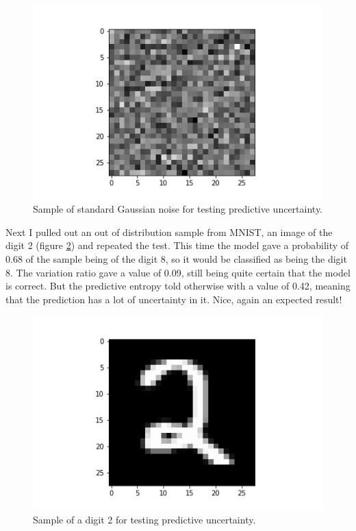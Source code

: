 \documentclass[11pt]{article}
\begin{document}
\begin{figure}
    \center
    \includegraphics[scale=0.5]{images/gaussian-noise}
    \caption{Sample of standard Gaussian noise for testing predictive uncertainty.}
    \label{fig:gaussian-noise}
\end{figure}

Next I pulled out an out of distribution sample from MNIST, an image of the digit 2 (figure \ref{fig:two}) and repeated the test. This time the model gave a probability of 0.68 of the sample being of the digit 8, so it would be classified as being the digit 8. The variation ratio gave a value of 0.09, still being quite certain that the model is correct. But the predictive entropy told otherwise with a value of 0.42, meaning that the prediction has a lot of uncertainty in it. Nice, again an expected result!

\begin{figure}
    \center
    \includegraphics[scale=0.5]{images/two}
    \caption{Sample of a digit 2 for testing predictive uncertainty.}
    \label{fig:two}
\end{figure}
\end{document}
